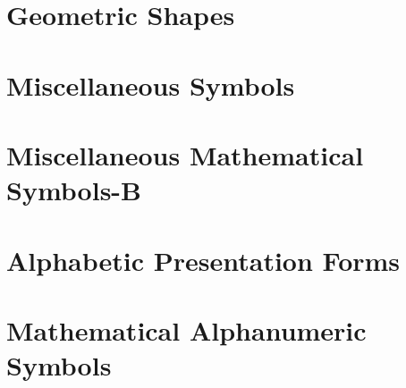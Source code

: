 \documentclass{article}
\begin{document}
\section{Geometric Shapes}

\section{Miscellaneous Symbols}

%
%
%
%
%
\section{Miscellaneous Mathematical Symbols-B}
%
%
%
\section{Alphabetic Presentation Forms}

\section{Mathematical Alphanumeric Symbols}
\end{document}
